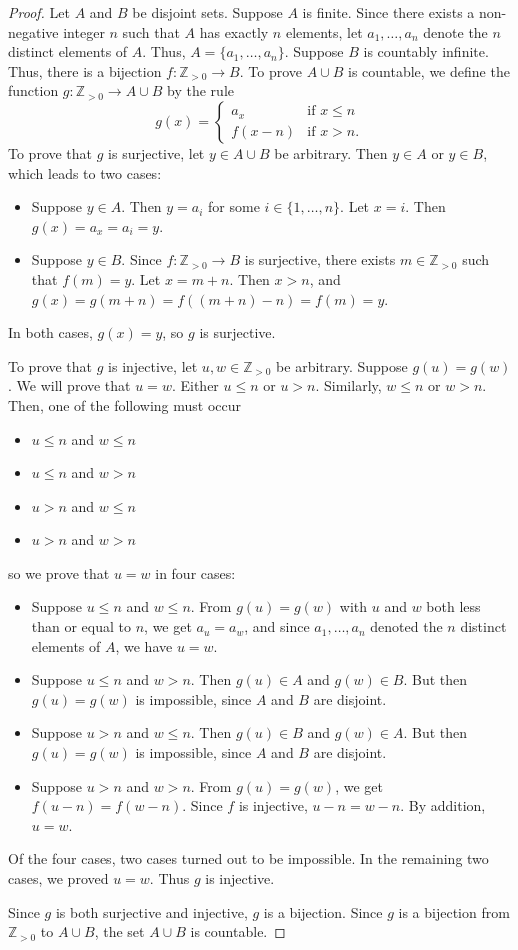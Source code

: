 \documentclass{book}
\theoremstyle{ekimcustom}
\begin{document}
\begin{proof}
Let $A$ and $B$ be disjoint sets. Suppose $A$ is finite. Since there exists a non-negative integer $n$ such that $A$ has exactly $n$ elements, let $a_1,\dots,a_n$ denote the $n$ distinct elements of $A$. Thus, $A = \{a_1,\dots,a_n\}$. Suppose $B$ is countably infinite. Thus, there is a bijection $f: \mathbb{Z}_{>0} \to B$. To prove $A \cup B$ is countable, we define the function $g: \mathbb{Z}_{>0} \to A \cup B$ by the rule
\[
g(x) = \left\{
\begin{array}{ll}
a_x & \text{if } x \leq n\\
f(x-n) & \text{if } x > n.
\end{array}
\right.
\]
To prove that $g$ is surjective, let $y \in A \cup B$ be arbitrary. Then $y \in A$ or $y \in B$, which leads to two cases:
\begin{itemize}
\item Suppose $y \in A$. Then $y=a_i$ for some $i \in \{1,\dots,n\}$. Let $x=i$. Then $g(x)=a_x=a_i=y$.
\item Suppose $y \in B$. Since $f: \mathbb{Z}_{>0} \to B$ is surjective, there exists $m \in \mathbb{Z}_{>0}$ such that $f(m)=y$. Let $x=m+n$. Then $x > n$, and $g(x)=g(m+n)=f((m+n)-n)=f(m)=y$.
\end{itemize}
In both cases, $g(x)=y$, so $g$ is surjective.

To prove that $g$ is injective, let $u, w \in \mathbb{Z}_{>0}$ be arbitrary. Suppose $g(u)=g(w)$. We will prove that $u=w$. Either $u \leq n$ or $u >n$. Similarly, $w \leq n$ or $w >n$. Then, one of the following must occur
\begin{itemize}
\item $u \leq n$ and $w \leq n$
\item $u \leq n$ and $w> n$
\item $u > n$ and $w \leq n$
\item $u > n$ and $w > n$
\end{itemize}
so we prove that $u=w$ in four cases:
\begin{itemize}
\item Suppose $u \leq n$ and $w \leq n$. From $g(u)=g(w)$ with $u$ and $w$ both less than or equal to $n$, we get $a_u=a_w$, and since $a_1,\dots,a_n$ denoted the $n$ distinct elements of $A$, we have $u=w$.
\item Suppose $u \leq n$ and $w > n$. Then $g(u) \in A$ and $g(w) \in B$. But then $g(u)=g(w)$ is impossible, since $A$ and $B$ are disjoint.
\item Suppose $u > n$ and $w \leq n$. Then $g(u) \in B$ and $g(w) \in A$. But then $g(u)=g(w)$ is impossible, since $A$ and $B$ are disjoint.
\item Suppose $u > n$ and $w > n$. From $g(u)=g(w)$, we get $f(u-n)=f(w-n)$. Since $f$ is injective, $u-n=w-n$. By addition, $u=w$.
\end{itemize}
Of the four cases, two cases turned out to be impossible. In the remaining two cases, we proved $u=w$. Thus $g$ is injective.

Since $g$ is both surjective and injective, $g$ is a bijection. Since $g$ is a bijection from $\mathbb{Z}_{>0}$ to $A \cup B$, the set $A \cup B$ is countable.
\end{proof}
\end{document}
